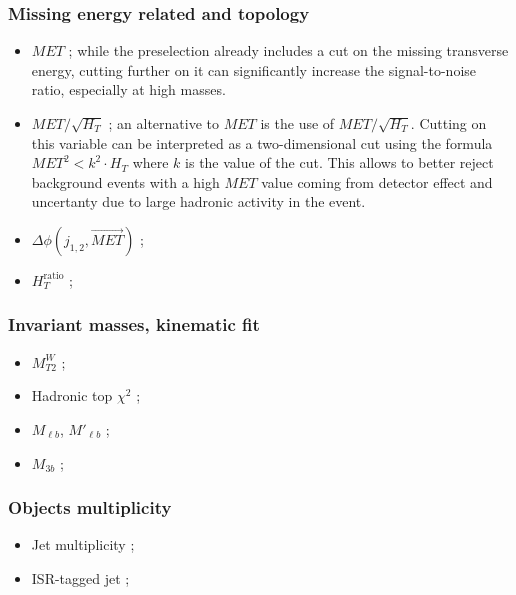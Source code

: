            \subsubsection{Missing energy related and topology}

                \begin{itemize}
                    \item  $MET$ ; while the preselection already includes a cut on the missing
                        transverse energy, cutting further on it can significantly increase the
                        signal-to-noise ratio, especially at high masses.
                    \item  $MET / \sqrt{H_T}$ ; an alternative to $MET$ is the use of $MET / \sqrt{H_T}$.
                        Cutting on this variable can be interpreted as a two-dimensional cut using
                        the formula $MET^{2} < k^2 \cdot H_T$ where $k$ is the value of the cut.
                        This allows to better reject background events with a high $MET$ value coming
                        from detector effect and uncertanty due to large hadronic activity in the event.
                    \item $\Delta \phi( j_{1,2}, \vec{MET} )$ ;
                    \item $H_{T}^\text{ratio}$ ;
                \end{itemize}

           \subsubsection{Invariant masses, kinematic fit}
           
                \begin{itemize}
                    \item $M_{T2}^{W}$ ;
                    \item Hadronic top $\chi^{2}$ ;
                    \item $M_{\ell b}$, $M'_{\ell b}$ ;
                    \item $M_{3b}$ ;
                \end{itemize}

           \subsubsection{Objects multiplicity}

                \begin{itemize}
                    \item Jet multiplicity ;
                    \item ISR-tagged jet ;
                \end{itemize}


